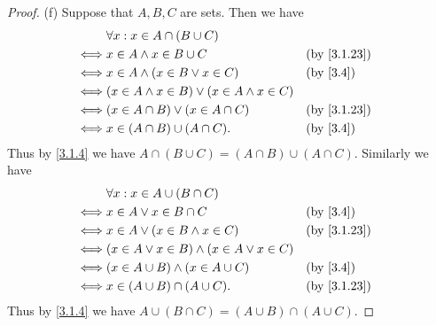 \begin{proof}{(f)}
  Suppose that \(A, B, C\) are sets.
  Then we have
  \begin{align*}
         & \forall x : x \in A \cap (B \cup C)                                   \\
    \iff & x \in A \land x \in B \cup C                         &  & \by{3.1.23} \\
    \iff & x \in A \land (x \in B \lor x \in C)                 &  & \by{3.4}    \\
    \iff & (x \in A \land x \in B) \lor (x \in A \land x \in C)                  \\
    \iff & (x \in A \cap B) \lor (x \in A \cap C)               &  & \by{3.1.23} \\
    \iff & x \in (A \cap B) \cup (A \cap C).                    &  & \by{3.4}
  \end{align*}
  Thus by \cref{3.1.4} we have \(A \cap (B \cup C) = (A \cap B) \cup (A \cap C)\).
  Similarly we have
  \begin{align*}
         & \forall x : x \in A \cup (B \cap C)                                  \\
    \iff & x \in A \lor x \in B \cap C                         &  & \by{3.4}    \\
    \iff & x \in A \lor (x \in B \land x \in C)                &  & \by{3.1.23} \\
    \iff & (x \in A \lor x \in B) \land (x \in A \lor x \in C)                  \\
    \iff & (x \in A \cup B) \land (x \in A \cup C)             &  & \by{3.4}    \\
    \iff & x \in (A \cup B) \cap (A \cup C).                   &  & \by{3.1.23}
  \end{align*}
  Thus by \cref{3.1.4} we have \(A \cup (B \cap C) = (A \cup B) \cap (A \cup C)\).
\end{proof}

